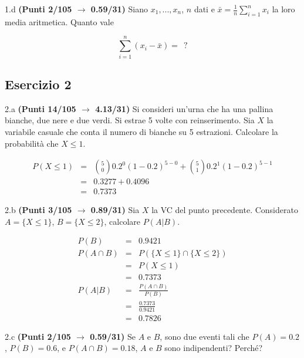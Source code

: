 \documentclass[
  11pt,
]{book}
\theoremstyle{mytheoremstyle}
\theoremstyle{mydefstyle}
\newenvironment{sol}
  {
  \begin{tcolorbox}[enhanced,breakable,arc=0.1mm,boxrule=1pt,colback=white,colframe=iblue,
  title=\bf \fontfamily{lmss}\selectfont \hspace{.5 cm} Soluzione,drop fuzzy shadow]

}{
\end{tcolorbox}
  }
\begin{document}
1.d \textbf{(Punti 2/105 \(\rightarrow\) 0.59/31)} Siano \(x_1,...,x_n\), \(n\) dati e \(\bar x=\frac 1n \sum_{i=1}^n x_i\) la loro media aritmetica. Quanto vale

\[
\sum_{i=1}^n (x_i-\bar x)=~~?
\]

\subsection{Esercizio 2}\label{esercizio-2-41}

2.a \textbf{(Punti 14/105 \(\rightarrow\) 4.13/31)} Si consideri un'urna che ha una pallina bianche, due nere e due verdi. Si estrae 5 volte con reinserimento. Sia \(X\) la variabile casuale che conta il numero di bianche su 5 estrazioni. Calcolare la probabilità che \(X\leq 1\).

\begin{sol}
\normalsize 
\begin{eqnarray*}
      P( X \leq 1 ) &=& \binom{ 5 }{ 0 } 0.2 ^{ 0 }(1- 0.2 )^{ 5 - 0 }+\binom{ 5 }{ 1 } 0.2 ^{ 1 }(1- 0.2 )^{ 5 - 1 } \\                 &=& 0.3277+0.4096 \\                 &=& 0.7373 
   \end{eqnarray*}
\normalsize 

\end{sol}

2.b \textbf{(Punti 3/105 \(\rightarrow\) 0.89/31)} Sia \(X\) la VC del punto precedente. Considerato \(A=\{X\leq 1\}\), \(B=\{X\leq 2\}\), calcolare \(P(A|B)\).

\begin{sol}
\begin{eqnarray*}
  P(B) &=&  0.9421\\
  P(A\cap B) &=& P( \{X \leq 1\} \cap \{X \leq 2\})\\
             &=& P(  X \leq 1)\\
             &=& 0.7373\\
  P(A|B)     &=& \frac{P(A\cap B)}{P(B)}\\
             &=& \frac{0.7373}{0.9421}\\
             &=& 0.7826
\end{eqnarray*}

\end{sol}

2.c \textbf{(Punti 2/105 \(\rightarrow\) 0.59/31)} Se \(A\) e \(B\), sono due eventi tali che \(P(A)=0.2\), \(P(B)=0.6\), e \(P(A\cap B)=0.18\), \(A\) e \(B\) sono indipendenti? Perché?
\end{document}
